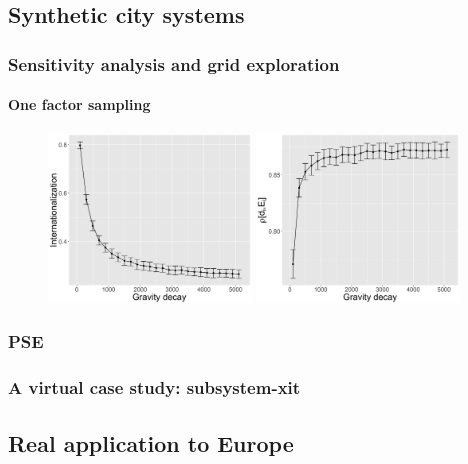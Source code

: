 \documentclass{article}
\begin{document}
\subsection{Synthetic city systems}

\subsubsection{Sensitivity analysis and grid exploration}

\paragraph{One factor sampling}


\begin{figure}
	\includegraphics[width=0.48\textwidth]{figures/internationalization-gravityDecay_errorbars.png}
    \includegraphics[width=0.48\textwidth]{figures/rhoDegreeSize-gravityDecay_errorbars.png}\\
    
\end{figure}



\subsubsection{PSE}


\subsubsection{A virtual case study: subsystem-xit}



\subsection{Real application to Europe}







\end{document}
